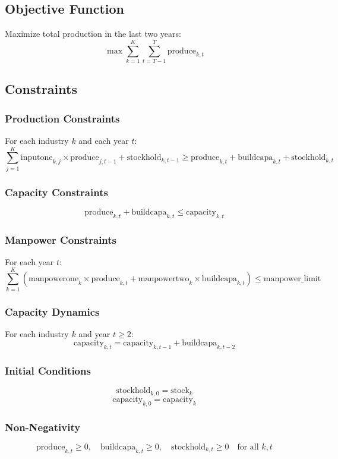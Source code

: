 \documentclass{article}
\begin{document}
\subsection*{Objective Function}
Maximize total production in the last two years:
\[
\max \sum_{k=1}^{K} \sum_{t=T-1}^{T} \text{produce}_{k,t} 
\]

\subsection*{Constraints}
\subsubsection*{Production Constraints}
For each industry \(k\) and each year \(t\):
\[
\sum_{j=1}^{K} \text{inputone}_{k,j} \times \text{produce}_{j,t-1} + \text{stockhold}_{k,t-1} \geq \text{produce}_{k,t} + \text{buildcapa}_{k,t} + \text{stockhold}_{k,t}
\]

\subsubsection*{Capacity Constraints}
\[
\text{produce}_{k,t} + \text{buildcapa}_{k,t} \leq \text{capacity}_{k,t}
\]

\subsubsection*{Manpower Constraints}
For each year \(t\):
\[
\sum_{k=1}^{K} (\text{manpowerone}_{k} \times \text{produce}_{k,t} + \text{manpowertwo}_{k} \times \text{buildcapa}_{k,t}) \leq \text{manpower\_limit}
\]

\subsubsection*{Capacity Dynamics}
For each industry \(k\) and year \(t\geq2\):
\[
\text{capacity}_{k,t} = \text{capacity}_{k,t-1} + \text{buildcapa}_{k,t-2}
\]

\subsubsection*{Initial Conditions}
\[
\text{stockhold}_{k,0} = \text{stock}_{k}
\]
\[
\text{capacity}_{k,0} = \text{capacity}_{k}
\]

\subsubsection*{Non-Negativity}
\[
\text{produce}_{k,t} \geq 0, \quad \text{buildcapa}_{k,t} \geq 0, \quad \text{stockhold}_{k,t} \geq 0 \quad \text{for all } k, t
\]
\end{document}

